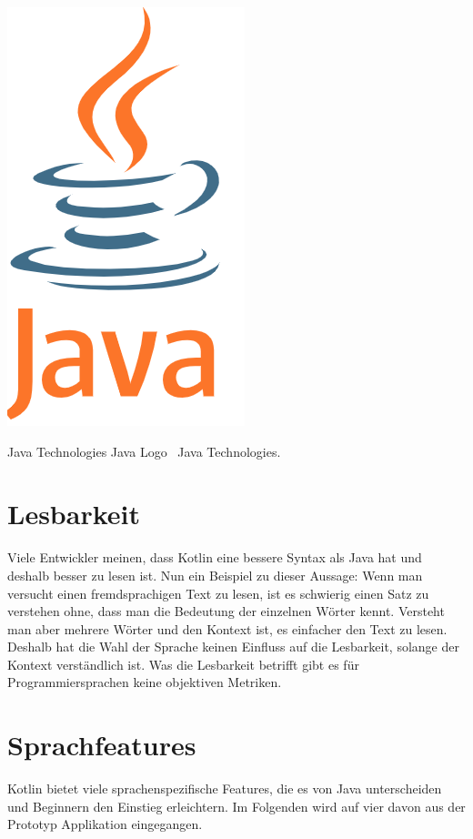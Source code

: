 \documentclass{sigchi-ext}
\begin{document}
\begin{marginfigure}[1pc]
  \begin{minipage}{\marginparwidth}
    \includegraphics[width=0.9\marginparwidth]{figures/javalogo.png}
    \caption{Java Technologies Java Logo
      \cczero~Java Technologies.}
  \end{minipage}
\end{marginfigure}


\section{Lesbarkeit}
Viele Entwickler meinen, dass Kotlin eine bessere Syntax als Java hat und deshalb besser
zu lesen ist. Nun ein Beispiel zu dieser Aussage: Wenn man versucht einen fremdsprachigen
Text zu lesen, ist es schwierig einen Satz zu verstehen ohne, dass man die Bedeutung der
einzelnen Wörter kennt. Versteht man aber mehrere Wörter und den Kontext ist, es einfacher den
Text zu lesen. Deshalb hat die Wahl der Sprache keinen Einfluss auf die Lesbarkeit, solange
der Kontext verständlich ist.
Was die Lesbarkeit betrifft gibt es für Programmiersprachen keine objektiven Metriken.

\section{Sprachfeatures}
Kotlin bietet viele sprachenspezifische Features, die es von Java unterscheiden und Beginnern den Einstieg erleichtern. Im Folgenden wird auf vier davon aus der Prototyp Applikation eingegangen.
\end{document}

